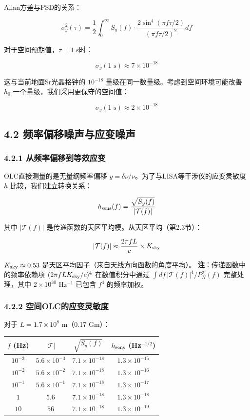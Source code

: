 \documentclass[12pt,a4paper]{article}
\begin{document}
Allan方差与PSD的关系：

$$\sigma_y^2(\tau) = \frac{1}{2} \int_0^\infty S_y(f) \cdot \frac{2\sin^4(\pi f \tau/2)}{(\pi f \tau/2)^2} df$$

对于空间预期值，$\tau = 1$ s时：

$$\sigma_y(1\text{ s}) \approx 7 \times 10^{-18}$$

这与当前地面Sr光晶格钟的 $10^{-18}$ 量级在同一数量级。考虑到空间环境可能改善 $h_0$ 一个量级，我们采用更保守的空间值：

$$\sigma_y(1\text{ s}) \approx 2 \times 10^{-18}$$

\subsection{4.2 频率偏移噪声与应变噪声}


\subsubsection{4.2.1 从频率偏移到等效应变}


OLC直接测量的是无量纲频率偏移 $y = \delta\nu/\nu$。为了与LISA等干涉仪的应变灵敏度 $h$ 比较，我们建立转换关系：

$$h_{\rm sens}(f) = \frac{\sqrt{S_y(f)}}{|\mathcal{T}(f)|}$$

其中 $|\mathcal{T}(f)|$ 是传递函数的天区平均模。从天区平均（第2.3节）：

$$|\mathcal{T}(f)| \approx \frac{2\pi f L}{c} \times K_{\rm sky}$$

$K_{\rm sky} \approx 0.53$ 是天区平均因子（来自天线方向函数的角度平均）。
\textbf{注}：传递函数中的频率依赖项 $(2\pi f L K_{\rm sky}/c)^4$ 在数值积分中通过 $\int df\,|\mathcal{T}(f)|^4/P_N^2(f)$ 完整处理，其中 $2\times 10^{30}$ Hz$^{-1}$ 已包含 $f^4$ 的频率加权。

\subsubsection{4.2.2 空间OLC的应变灵敏度}


对于 $L = 1.7 \times 10^8$ m（0.17 Gm）：

\begin{tabular}{|c|c|c|c|}
\hline
$f$ (Hz) & $|\mathcal{T}|$ & $\sqrt{S_y(f)}$ & $h_{\rm sens}$ (Hz$^{-1/2}$) \\
\hline
$10^{-3}$ & $5.6 \times 10^{-3}$ & $7.1 \times 10^{-18}$ & $1.3 \times 10^{-15}$ \\
$10^{-2}$ & $5.6 \times 10^{-2}$ & $7.1 \times 10^{-18}$ & $1.3 \times 10^{-16}$ \\
$10^{-1}$ & $5.6 \times 10^{-1}$ & $7.1 \times 10^{-18}$ & $1.3 \times 10^{-17}$ \\
$1$ & $5.6$ & $7.1 \times 10^{-18}$ & $1.3 \times 10^{-18}$ \\
$10$ & $56$ & $7.1 \times 10^{-18}$ & $1.3 \times 10^{-19}$ \\
\hline
\end{tabular}
\end{document}
